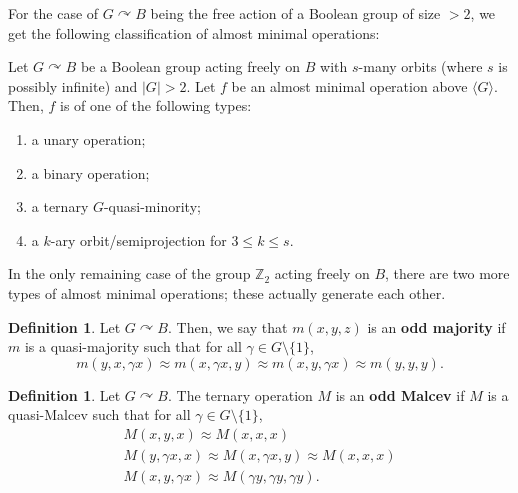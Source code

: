 \documentclass{article}
\newenvironment{customthm}[1]
  {\renewcommand\theinnercustomthm{#1}\innercustomthm}
  {\endinnercustomthm}
\theoremstyle{remark}
\theoremstyle{definition}
\newtheorem{definition}[theorem]{Definition}
\def\acts{\curvearrowright}
\begin{document}
For the case of $G\acts B$ being the free action of a Boolean group of size $>2$, we get the following classification of almost minimal operations:

\begin{customthm}{D}[Theorem~\ref{Boolcase}, Boolean case]\label{thmd} Let $G\acts B$ be a Boolean group acting freely on $B$ with $s$-many orbits (where $s$ is possibly infinite) and $|G|>2$. Let $f$ be an almost minimal operation above $\langle G \rangle$. Then,  $f$ is of one of the following types:
\begin{enumerate}
    \item a unary operation;
    \item a binary operation;
    \item a ternary $G$-quasi-minority;
    \item a $k$-ary orbit\-/semiprojection for $3\leq k \leq s$.
\end{enumerate} 
\end{customthm}



In the only remaining case of the group $\mathbb{Z}_2$ acting freely on $B$, there are two more types of almost minimal operations; these actually generate each other. 


\begin{definition}\label{oddmajdef} Let $G\acts B$. Then, we say that $m(x,y,z)$ is an \textbf{odd majority} if $m$ is a quasi-majority such that for all $\gamma \in G\setminus\{1\}$,
\begin{equation}\label{oddmaj}
    m(y,x, \gamma x) \approx m(x,\gamma x, y)\approx m(x,y,\gamma x)\approx m(y,y,y).
\end{equation}

\end{definition}

\begin{definition}\label{oddmaldef} Let $G\acts B$. The ternary operation $M$ is an \textbf{odd Malcev} if $M$ is a quasi-Malcev such that for all $\gamma\in G\setminus\{1\}$,
\begin{align}
M(x,y,x) \approx M(x,x,x) \label{oddm1}\\
M(y, \gamma x, x)\approx M(x, \gamma x, y)\approx M(x,x,x) \label{oddm2}\\
    M(x,y,\gamma x)\approx M(\gamma y, \gamma y, \gamma y). \label{oddm3}
\end{align}
\end{definition}
\end{document}
